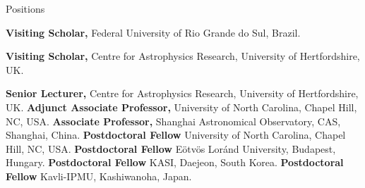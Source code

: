 \begin{rubric}{Positions}

\entry*[2025 -- $~\ldots$]%
	\textbf{Visiting Scholar,} Federal University of Rio Grande do Sul, Brazil.

\entry*[Current]%
	\textbf{Visiting Scholar,} Centre for Astrophysics Research, University of Hertfordshire, UK.

\entry*[2023 -- September 2024]%
	\textbf{Senior Lecturer,} Centre for Astrophysics Research, University of Hertfordshire, UK.
%
\entry*[2024 -- $~\ldots$]%
	\textbf{Adjunct Associate Professor,} University of North Carolina, Chapel Hill, NC, USA.
% 
\entry*[2020 -- 2022]%
	\textbf{Associate Professor,} Shanghai Astronomical Observatory, CAS, Shanghai, China.
%
%
\entry*[2017 -- 2020]%
	\textbf{Postdoctoral Fellow} University of North Carolina, Chapel Hill, NC, USA.
%
\entry*[2014 -- 2016]%
	\textbf{Postdoctoral Fellow} Eötvös Loránd University, Budapest, Hungary.
\entry*[2012 -- 2014]%
	\textbf{Postdoctoral Fellow} KASI, Daejeon, South Korea.
\entry*[2010 -- 2011]%
	\textbf{Postdoctoral Fellow} Kavli-IPMU, Kashiwanoha, Japan.
\end{rubric}



 
 
